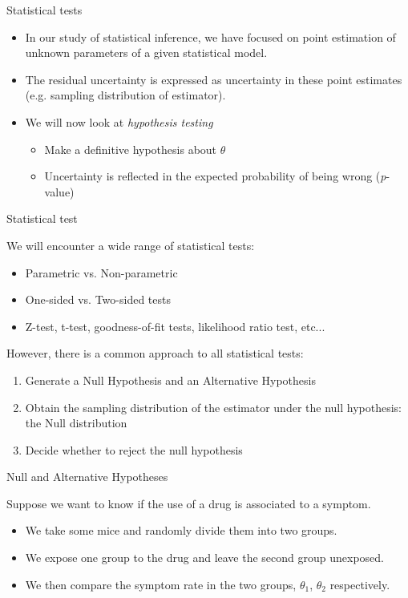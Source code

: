 \documentclass{beamer}
\begin{document}
\begin{frame}{Statistical tests}

	\begin{itemize}
		\item In our study of statistical inference, we have focused on point estimation
	of unknown parameters of a given statistical model.
		\item  The residual uncertainty is expressed as uncertainty in these point
	estimates (e.g. sampling distribution of estimator).
		\item We will now look at \textit{hypothesis testing}
		\begin{itemize}
 			\item Make a definitive hypothesis about $\theta$
			\item Uncertainty is reflected in the expected probability of being wrong (\textit{p}-value)
		\end{itemize}
	\end{itemize}

\end{frame}

\begin{frame}{Statistical test}

	We will encounter a wide range of statistical tests:
	\begin{itemize}
		\item Parametric vs. Non-parametric
		\item One-sided vs. Two-sided tests
		\item Z-test, t-test, goodness-of-fit tests, likelihood ratio test, etc...
	\end{itemize}

	\pause

	However, there is a common approach to all statistical tests:
	\begin{enumerate}	
		\item Generate a Null Hypothesis and an Alternative Hypothesis
		\item Obtain the sampling distribution of the estimator under the null
		hypothesis: the Null distribution
		\item Decide whether to reject the null hypothesis
	\end{enumerate}

\end{frame}

\begin{frame}{Null and Alternative Hypotheses}

	Suppose we want to know if the use of a drug is associated to a symptom.

	\begin{itemize}
	\item We take some mice and randomly divide them into two groups.

	\item We expose one group to the drug and leave the second group unexposed.

	\item We then compare the symptom rate in the two groups, $\theta_1$, $\theta_2$ respectively.
	\end{itemize}

\end{frame}
\end{document}
